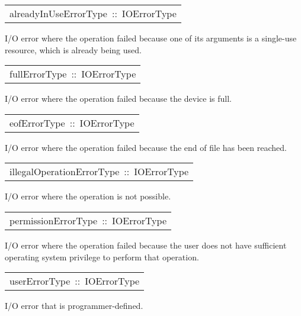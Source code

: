\begin{haddockdesc}
\item[\begin{tabular}{@{}l}
alreadyInUseErrorType\ ::\ IOErrorType
\end{tabular}]\haddockbegindoc
I/O error where the operation failed because one of its arguments
 is a single-use resource, which is already being used.
\par

\end{haddockdesc}
\begin{haddockdesc}
\item[\begin{tabular}{@{}l}
fullErrorType\ ::\ IOErrorType
\end{tabular}]\haddockbegindoc
I/O error where the operation failed because the device is full.
\par

\end{haddockdesc}
\begin{haddockdesc}
\item[\begin{tabular}{@{}l}
eofErrorType\ ::\ IOErrorType
\end{tabular}]\haddockbegindoc
I/O error where the operation failed because the end of file has
 been reached.
\par

\end{haddockdesc}
\begin{haddockdesc}
\item[\begin{tabular}{@{}l}
illegalOperationErrorType\ ::\ IOErrorType
\end{tabular}]\haddockbegindoc
I/O error where the operation is not possible.
\par

\end{haddockdesc}
\begin{haddockdesc}
\item[\begin{tabular}{@{}l}
permissionErrorType\ ::\ IOErrorType
\end{tabular}]\haddockbegindoc
I/O error where the operation failed because the user does not
 have sufficient operating system privilege to perform that operation.
\par

\end{haddockdesc}
\begin{haddockdesc}
\item[\begin{tabular}{@{}l}
userErrorType\ ::\ IOErrorType
\end{tabular}]\haddockbegindoc
I/O error that is programmer-defined.
\par

\end{haddockdesc}
